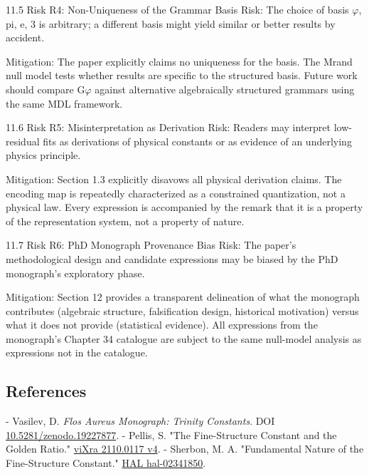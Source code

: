   11.5 Risk R4: Non-Uniqueness of the Grammar Basis
  Risk: The choice of basis {$\varphi$, pi, e, 3} is arbitrary; a different basis might yield similar
  or better results by accident.

  Mitigation: The paper explicitly claims no uniqueness for the basis. The Mrand null
  model tests whether results are specific to the structured basis. Future work should
  compare G$\varphi$ against alternative algebraically structured grammars using the same
  MDL framework.

  11.6 Risk R5: Misinterpretation as Derivation
  Risk: Readers may interpret low-residual fits as derivations of physical constants or as
  evidence of an underlying physics principle.

  Mitigation: Section 1.3 explicitly disavows all physical derivation claims. The encoding
  map is repeatedly characterized as a constrained quantization, not a physical law.
  Every expression is accompanied by the remark that it is a property of the
  representation system, not a property of nature.

  11.7 Risk R6: PhD Monograph Provenance Bias
  Risk: The paper's methodological design and candidate expressions may be biased by
  the PhD monograph's exploratory phase.

  Mitigation: Section 12 provides a transparent delineation of what the monograph
  contributes (algebraic structure, falsification design, historical motivation) versus what
  it does not provide (statistical evidence). All expressions from the monograph's Chapter
  34 catalogue are subject to the same null-model analysis as expressions not in the
  catalogue.

\subsection{References}

- Vasilev, D. \textit{Flos Aureus Monograph: Trinity Constants}. DOI \href{https://zenodo.org/doi/10.5281/zenodo.19227877}{10.5281/zenodo.19227877}.
- Pellis, S. "The Fine-Structure Constant and the Golden Ratio." \href{https://vixra.org/pdf/2110.0117v4.pdf}{viXra 2110.0117 v4}.
- Sherbon, M. A. "Fundamental Nature of the Fine-Structure Constant." \href{https://hal.science/hal-02341850/document}{HAL hal-02341850}.
